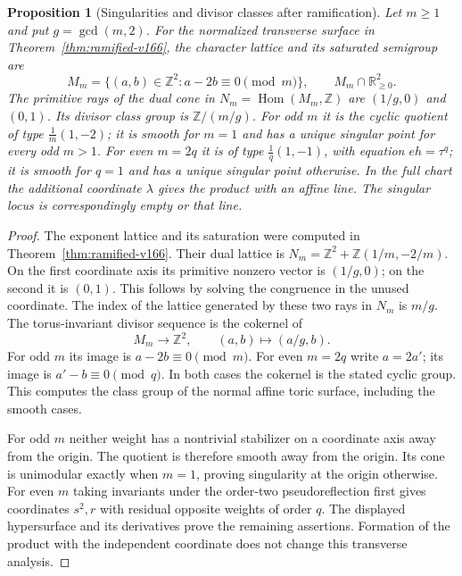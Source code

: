 \documentclass[11pt,reqno]{amsart}
\numberwithin{equation}{section}
\newtheorem{proposition}[theorem]{Proposition}
\theoremstyle{definition}\newtheorem{definition}[theorem]{Definition}
\theoremstyle{remark}\newtheorem{remark}[theorem]{Remark}
\DeclareMathOperator{\Hom}{Hom}\DeclareMathOperator{\Tot}{Tot}
\begin{document}
\begin{proposition}[Singularities and divisor classes after ramification]
\label{prop:toric-classes-v167}
Let $m\geq1$ and put $g=\gcd(m,2)$. For the normalized transverse
surface in Theorem~\ref{thm:ramified-v166}, the character lattice
and its saturated semigroup are
\[
 M_m=\{(a,b)\in\mathbb Z^2:a-2b\equiv0\pmod m\},\qquad
                         M_m\cap\mathbb R_{\geq0}^2.
\]
The primitive rays of the dual cone in $N_m=\Hom(M_m,\mathbb Z)$
are $(1/g,0)$ and $(0,1)$. Its divisor class group is
$\mathbb Z/(m/g)$. For odd $m$ it is the cyclic quotient of type
$\frac1m(1,-2)$; it is smooth for $m=1$ and has a unique singular
point for every odd $m>1$. For even $m=2q$ it is of type
$\frac1q(1,-1)$, with equation $eh=\tau^q$; it is smooth for
$q=1$ and has a unique singular point otherwise. In the full
chart the additional coordinate $\lambda$ gives the product with
an affine line. The singular locus is correspondingly empty or
that line.
\end{proposition}
\begin{proof}
The exponent lattice and its saturation were computed in
Theorem~\ref{thm:ramified-v166}. Their dual lattice is
$N_m=\mathbb Z^2+\mathbb Z(1/m,-2/m)$. On the first coordinate
axis its primitive nonzero vector is $(1/g,0)$; on the second it
is $(0,1)$. This follows by solving the congruence in the unused
coordinate. The index of the lattice generated by these two rays
in $N_m$ is $m/g$. The torus-invariant divisor sequence is the
cokernel of
\[
 M_m\longrightarrow\mathbb Z^2,\qquad (a,b)\longmapsto(a/g,b).
\]
For odd $m$ its image is $a-2b\equiv0\pmod m$. For even
$m=2q$ write $a=2a'$; its image is
$a'-b\equiv0\pmod q$. In both cases the cokernel is the stated
cyclic group. This computes the class group of the normal affine
toric surface, including the smooth cases.

For odd $m$ neither weight has a nontrivial stabilizer on a
coordinate axis away from the origin. The quotient is therefore
smooth away from the origin. Its cone is unimodular exactly when
$m=1$, proving singularity at the origin otherwise. For even
$m$ taking invariants under the order-two pseudoreflection first
gives coordinates $s^2,r$ with residual opposite weights of order
$q$. The displayed hypersurface and its derivatives prove the
remaining assertions. Formation of the product with the
independent coordinate does not change this transverse analysis.
\end{proof}
\end{document}
